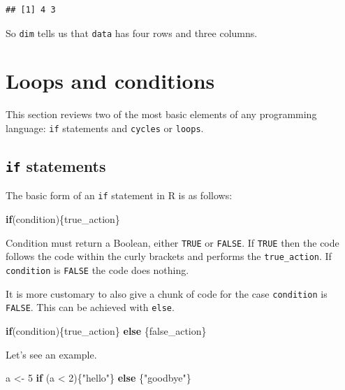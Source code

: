 \documentclass[
]{book}
\newenvironment{Shaded}{\begin{snugshade}}{\end{snugshade}}
\newcommand{\ControlFlowTok}[1]{\textcolor[rgb]{0.13,0.29,0.53}{\textbf{#1}}}
\newcommand{\DecValTok}[1]{\textcolor[rgb]{0.00,0.00,0.81}{#1}}
\newcommand{\NormalTok}[1]{#1}
\newcommand{\OtherTok}[1]{\textcolor[rgb]{0.56,0.35,0.01}{#1}}
\newcommand{\SpecialCharTok}[1]{\textcolor[rgb]{0.00,0.00,0.00}{#1}}
\newcommand{\StringTok}[1]{\textcolor[rgb]{0.31,0.60,0.02}{#1}}
\begin{document}
\begin{verbatim}
## [1] 4 3
\end{verbatim}

So \texttt{dim} tells us that \texttt{data} has four rows and three columns.

\hypertarget{loops-and-conditions}{%
\section{Loops and conditions}\label{loops-and-conditions}}

This section reviews two of the most basic elements of any programming language: \texttt{if} statements and \texttt{cycles} or \texttt{loops}.

\hypertarget{if-statements}{%
\subsection{\texorpdfstring{\texttt{if} statements}{if statements}}\label{if-statements}}

The basic form of an \texttt{if} statement in R is as follows:

\begin{Shaded}
\begin{Highlighting}[]
\ControlFlowTok{if}\NormalTok{(condition)\{true\_action\}}
\end{Highlighting}
\end{Shaded}

Condition must return a Boolean, either \texttt{TRUE} or \texttt{FALSE}. If \texttt{TRUE} then the code follows the code within the curly brackets and performs the \texttt{true\_action}. If \texttt{condition} is \texttt{FALSE} the code does nothing.

It is more customary to also give a chunk of code for the case \texttt{condition} is \texttt{FALSE}. This can be achieved with \texttt{else}.

\begin{Shaded}
\begin{Highlighting}[]
\ControlFlowTok{if}\NormalTok{(condition)\{true\_action\} }\ControlFlowTok{else}\NormalTok{ \{false\_action\}}
\end{Highlighting}
\end{Shaded}

Let's see an example.

\begin{Shaded}
\begin{Highlighting}[]
\NormalTok{a }\OtherTok{\textless{}{-}} \DecValTok{5}
\ControlFlowTok{if}\NormalTok{ (a }\SpecialCharTok{\textless{}} \DecValTok{2}\NormalTok{)\{}\StringTok{"hello"}\NormalTok{\} }\ControlFlowTok{else}\NormalTok{ \{}\StringTok{"goodbye"}\NormalTok{\}}
\end{Highlighting}
\end{Shaded}
\end{document}
